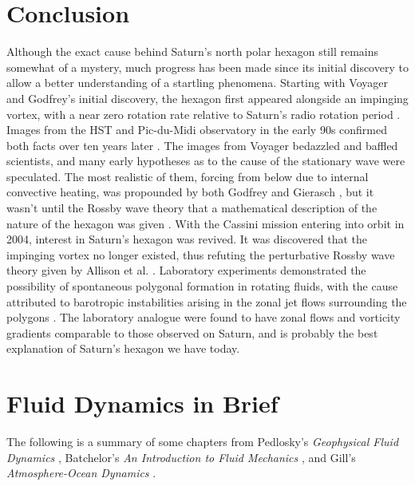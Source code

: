 \documentclass[preprint]{revtex4-1} %
\begin{document}
\section{Conclusion}
\label{sec:conclusion}
Although the exact cause behind Saturn's north polar hexagon
still remains somewhat of a mystery, much progress has been made since
its initial discovery to allow a better understanding of a startling
phenomena.  Starting with Voyager and Godfrey's initial discovery, the
hexagon first appeared alongside an impinging vortex, with a near zero
rotation rate relative to Saturn's radio rotation period
\cite{Godfrey1988}.  Images from
the HST and Pic-du-Midi observatory in the early 90s confirmed both
facts over ten years later \cite{Caldwell1993, SanchezLavega1993}.  The images 
from Voyager bedazzled and baffled scientists, and many early
hypotheses as to the cause of the stationary wave were
speculated.  The most realistic of them, forcing from below due to internal
convective heating, was propounded by both Godfrey and Gierasch
\cite{Godfrey1988, Gierasch1989}, but it wasn't until the Rossby wave
theory that a mathematical description of the nature of the hexagon
was given \cite{Allison1990}.  With the Cassini mission entering into
orbit in 2004, interest in Saturn's hexagon was revived.  It was
discovered that the impinging vortex no longer existed, thus refuting
the perturbative Rossby wave theory given by Allison et
al. \cite{Baines2009}.  Laboratory experiments demonstrated the
possibility of spontaneous polygonal formation in rotating fluids,
with the cause attributed to barotropic instabilities arising in the
zonal jet flows surrounding the polygons \cite{BarbosaAguiar2010,
  Jansson2006, MoralesJuberias2011}.  The laboratory analogue were
found to have zonal flows and vorticity gradients comparable to those observed on
Saturn, and is probably the best explanation of Saturn's
hexagon we have today.

\appendix*
\section{Fluid Dynamics in Brief}
\label{app:fluidDyn}
The following is a summary of some chapters from
Pedlosky's \textit{Geophysical Fluid Dynamics} \cite{Pedlosky87},
Batchelor's \textit{An Introduction to Fluid Mechanics}
\cite{Batchelor67}, and Gill's \textit{Atmosphere-Ocean Dynamics} \cite{Gill82}.  
\end{document}
